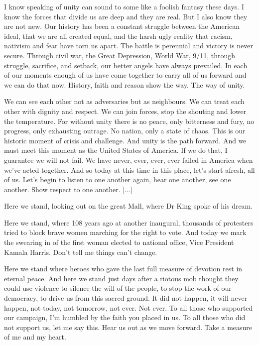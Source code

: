 \documentclass[10pt,a4paper]{article}
\begin{document}
I know speaking of unity can sound to some like a foolish fantasy these days. I know the forces that divide us are deep and they are real. But I also know they are not new. Our history has been a constant struggle between the American ideal, that we are all created equal, and the harsh ugly reality that racism, nativism and fear have torn us apart. The battle is perennial and victory is never secure. Through civil war, the Great Depression, World War, 9/11, through struggle, sacrifice, and setback, our
better angels have always prevailed. In each of our moments enough of us have come together to carry all of us forward and we can do that now. History, faith and reason show the way. The way of unity.

We can see each other not as adversaries but as neighbours. We can treat each other with dignity and respect. We can join forces, stop the shouting and lower the temperature. For without unity there is no peace, only bitterness and fury, no progress, only exhausting outrage. No nation, only a state of chaos. This is our historic moment of crisis and challenge. And unity is the path forward. And we must meet this moment as the United States of America. If we do that, I guarantee we will not fail. We have never, ever, ever, ever failed in America when we've acted together. And so today at this time in this place, let's start afresh, all of us. Let's begin to listen to one another again, hear one another, see one another. Show respect to one another. [...]

Here we stand, looking out on the great Mall, where Dr King spoke of his dream.

Here we stand, where 108 years ago at another inaugural, thousands of protesters tried to block brave women marching for the right to vote. And today we mark the swearing in of the first woman elected to national office, Vice President Kamala Harris. Don't tell me things can't change.

Here we stand where heroes who gave the last full measure of devotion rest in eternal peace. And here we stand just days after a riotous mob thought they could use violence to silence the will of the people, to stop the work of our democracy, to drive us from this sacred ground. It did not happen, it will never happen, not today, not tomorrow, not ever. Not ever. To all those who supported our campaign, I'm humbled by the faith you placed in us. To all those who did not support us, let me say this. Hear us out as we move forward. Take a measure of me and my heart.
\end{document}

